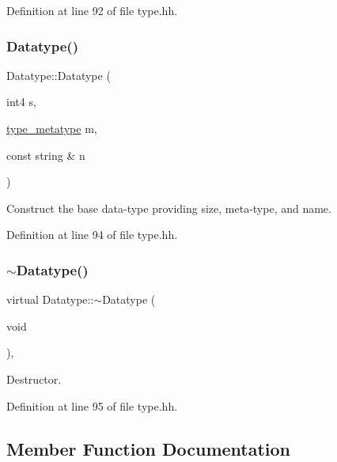 Definition at line 92 of file type.\+hh.

\mbox{\label{class_datatype_ada9a0a6dfa2e5fdc91fc81b71c0b5890}} 
\subsubsection{\texorpdfstring{Datatype()}{Datatype()}\hspace{0.1cm}{\footnotesize\ttfamily [3/3]}}
{\footnotesize\ttfamily Datatype\+::\+Datatype (\begin{DoxyParamCaption}\item[{int4}]{s,  }\item[{\mbox{\hyperlink{type_8hh_aef6429f2523cdf4d415ba04a0209e61f}{type\+\_\+metatype}}}]{m,  }\item[{const string \&}]{n }\end{DoxyParamCaption})\hspace{0.3cm}{\ttfamily [inline]}}



Construct the base data-\/type providing size, meta-\/type, and name. 



Definition at line 94 of file type.\+hh.

\mbox{\label{class_datatype_ab3ed7d0715b686cb0eef82a3249a5dbe}} 
\subsubsection{\texorpdfstring{$\sim$Datatype()}{~Datatype()}}
{\footnotesize\ttfamily virtual Datatype\+::$\sim$\+Datatype (\begin{DoxyParamCaption}\item[{void}]{ }\end{DoxyParamCaption})\hspace{0.3cm}{\ttfamily [inline]}, {\ttfamily [virtual]}}



Destructor. 



Definition at line 95 of file type.\+hh.



\subsection{Member Function Documentation}
\mbox{\label{class_datatype_a6bd032d91f40efe36841adc85b3ff0ec}} 
